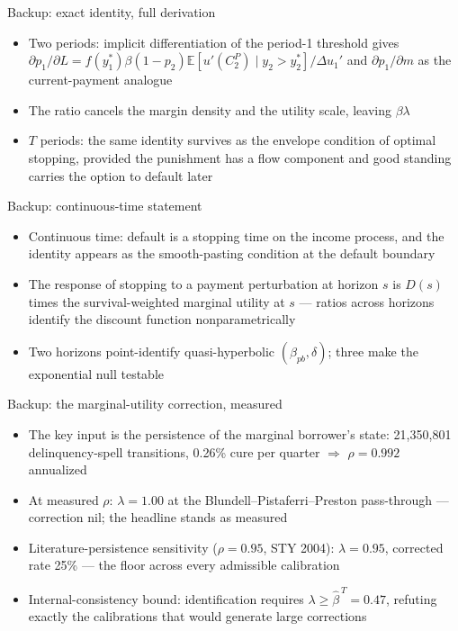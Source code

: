 \documentclass[11pt,aspectratio=169]{beamer}
\newenvironment{wideitemize}{\begin{itemize}\setlength{\itemsep}{0.7em}}{\end{itemize}}
\newcommand{\back}[2]{\hyperlink{#1}{\beamerreturnbutton{#2}}}
\newcommand{\buttonrow}[1]{\vspace{0.3em}\hfill #1}
\begin{document}
\begin{frame}{Backup: exact identity, full derivation}
\begin{wideitemize}
  \item Two periods: implicit differentiation of the period-1 threshold
        gives $\partial p_1/\partial L = f(y_1^*)\beta(1-p_2)
        \mathbb{E}[u'(C_2^P)\mid y_2 > y_2^*]/\Delta u_1'$ and
        $\partial p_1/\partial m$ as the current-payment analogue
  \item The ratio cancels the margin density and the utility scale,
        leaving $\beta\lambda$
  \item $T$ periods: the same identity survives as the envelope condition
        of optimal stopping, provided the punishment has a flow component
        and good standing carries the option to default later
\end{wideitemize}
\end{frame}

\begin{frame}{Backup: continuous-time statement}
\begin{wideitemize}
  \item Continuous time: default is a stopping time on the income process,
        and the identity appears as the smooth-pasting condition at the
        default boundary
  \item The response of stopping to a payment perturbation at horizon $s$
        is $D(s)$ times the survival-weighted marginal utility at $s$ ---
        ratios across horizons identify the discount function
        nonparametrically
  \item Two horizons point-identify quasi-hyperbolic $(\beta_{pb},
        \delta)$; three make the exponential null testable
\end{wideitemize}
\end{frame}

\begin{frame}[label=b_mu]{Backup: the marginal-utility correction, measured}
\begin{wideitemize}
  \item The key input is the persistence of the marginal borrower's state:
        21{,}350{,}801 delinquency-spell transitions, \alert{0.26\% cure
        per quarter} $\Rightarrow$ $\rho = 0.992$ annualized
  \item At measured $\rho$: $\lambda = 1.00$ at the
        Blundell--Pistaferri--Preston pass-through --- \alert{correction
        nil}; the headline stands as measured
  \item Literature-persistence sensitivity ($\rho = 0.95$, STY 2004):
        $\lambda = 0.95$, corrected rate 25\% --- the floor across every
        admissible calibration
  \item Internal-consistency bound: identification requires
        $\lambda \ge \widehat\beta^{\,T} = 0.47$, refuting exactly the
        calibrations that would generate large corrections
\end{wideitemize}
\buttonrow{\back{baseline}{back: baseline}}
\end{frame}
\end{document}
